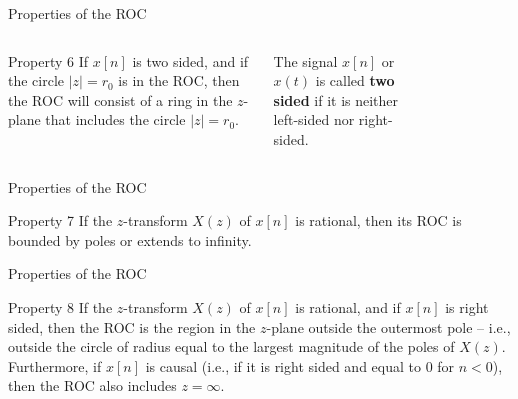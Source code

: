 \documentclass[aspectratio=169]{beamer}
\newcommand{\Cross}{$\mathbin{\tikz [x=1.4ex,y=1.4ex,line width=.2ex] \draw (0,0) -- (1,1) (0,1) -- (1,0);}$}%
\begin{document}
\begin{frame}{Properties of the ROC}
	\begin{columns}
		\begin{block}{Property 6}
			If $ x[n] $ is two sided, and if the circle $ |z| = r_0 $ is in the ROC, then the ROC will consist of a ring in the $ z $-plane that includes the circle $ |z| = r_0 $.
		\end{block}
		
		
		\begin{definition}
			The signal $ x[n] $ or $ x(t) $ is called \textbf{two sided} if it is neither left-sided nor right-sided.
		\end{definition}
		
		
		\begin{figure}[h!]
			\centering
		\end{figure}
		
	\end{columns}
	
\end{frame}

\begin{frame}{Properties of the ROC}
	\begin{block}{Property 7}
		If the $ z $-transform $ X(z) $ of $ x[n] $ is rational, then its ROC is bounded by poles or extends to infinity.
	\end{block}
\end{frame}

\begin{frame}{Properties of the ROC}
	\begin{block}{Property 8}
		If the $ z $-transform $ X(z) $ of $ x[n] $ is rational, and if $ x[n] $ is right sided, then the ROC is the region in the $ z $-plane outside the outermost pole -- i.e., outside the circle of radius equal to the largest magnitude of the poles of $ X(z) $. Furthermore, if $ x[n] $ is
		causal (i.e., if it is right sided and equal to $ 0 $ for $ n < 0 $), then the ROC also includes $ z = \infty $.
	\end{block}
\end{frame}
\end{document}
